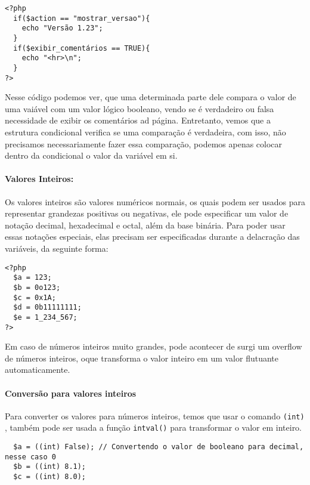 \documentclass[12pt a4paper]{paper}
\begin{document}
\begin{verbatim}
<?php
  if($action == "mostrar_versao"){
    echo "Versão 1.23";
  }
  if($exibir_comentários == TRUE){
    echo "<hr>\n";
  }
?>  
\end{verbatim}

Nesse código podemos ver, que uma determinada parte dele compara o valor de uma 
vaiável com um valor lógico booleano, vendo se é verdadeiro ou falsa necessidade de 
exibir os comentários ad página. Entretanto, vemos que a estrutura condicional verifica 
se uma comparação é verdadeira, com isso, não precisamos necessariamente fazer essa 
comparação, podemos apenas colocar dentro da condicional o valor da variável em si. 

\paragraph{Valores Inteiros:} %
\label{par:Valores Inteiros:}
Os valores inteiros são valores numéricos normais, os quais podem ser usados para 
representar grandezas positivas ou negativas, ele pode especificar um valor de notação 
decimal, hexadecimal e octal, além da base binária. Para poder usar essas notações 
especiais, elas precisam ser especificadas durante a delacração das variáveis, da 
seguinte forma:

\begin{verbatim}
<?php
  $a = 123;
  $b = 0o123;
  $c = 0x1A;
  $d = 0b11111111;
  $e = 1_234_567;   
?>  
\end{verbatim}

Em caso de números inteiros muito grandes, pode acontecer de surgi um overflow de
números inteiros, oque transforma o valor inteiro em um valor flutuante automaticamente.

\paragraph{Conversão para valores inteiros} %
\label{par:Conversão para valores inteiros}
Para converter os valores para números inteiros, temos que usar o comando \texttt{(int)}
, também pode ser usada a função \texttt{intval()} para transformar o valor em inteiro. 

\begin{verbatim}  
  $a = ((int) False); // Convertendo o valor de booleano para decimal, nesse caso 0
  $b = ((int) 8.1);
  $c = ((int) 8.0);
\end{verbatim}
\end{document}
